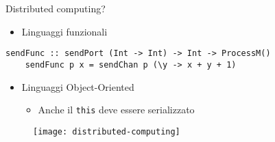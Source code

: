 \begin{frame}[fragile]{Distributed computing?}
	\begin{itemize}
		\item Linguaggi funzionali
	\end{itemize}
	\begin{lstlisting}[basicstyle=\fontsize{9}{9}\ttfamily]
	sendFunc :: sendPort (Int -> Int) -> Int -> ProcessM()
	sendFunc p x = sendChan p (\y -> x + y + 1)
	\end{lstlisting}
	\begin{itemize}
		\item Linguaggi Object-Oriented
		\begin{itemize}
			\item Anche il \texttt{this} deve essere serializzato
		\end{itemize}
	\end{itemize}
	\begin{figure}
		\centering\texttt{[image: distributed-computing]}
	\end{figure}
\end{frame}